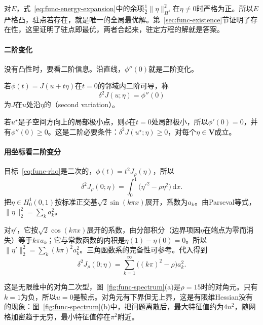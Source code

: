 对$E$，式~\eqref{eq:func-energy-expansion}中的余项$\frac12\lVert\eta\rVert_{H^1}^2$在$\eta\neq0$时严格为正。所以$E$严格凸，驻点若存在，就是唯一的全局最优解。第~\ref{sec:func-existence}节证明了存在性，这里证明了驻点即最优，两者合起来，驻定方程的解就是答案。

\paragraph{二阶变化}
没有凸性时，要看二阶信息。沿直线，$\phi''(0)$就是二阶变化。

\begin{definition}[二阶变分]
\label{def:func-second-variation}
若$\phi(t)=J(u+t\eta)$在$t=0$的邻域内二阶可导，称
\begin{equation}
 \delta^2J(u;\eta)=\phi''(0)
 \label{eq:func-second-variation}
\end{equation}
为$J$在$u$处沿$\eta$的（second variation）。
\end{definition}

若$u^\star$是子空间方向上的局部极小点，则$\phi$在$t=0$处局部极小，所以$\phi'(0)=0$，并有$\phi''(0)\geq0$。这是二阶必要条件：$\delta^2J(u^\star;\eta)\geq0$，对每个$\eta\in\bm{V}$成立。

\paragraph{用坐标看二阶变分}
目标~\eqref{eq:func-rho}是二次的，$\phi(t)=t^2J_\rho(\eta)$，所以
\[
 \delta^2J_\rho(0;\eta)=\int_0^1\bigl(\eta'^2-\rho\eta^2\bigr)\,\mathrm{d}x.
\]
把$\eta\in H^1_0(0,1)$按标准正交基$\sqrt2\sin(k\pi x)$展开，系数为$a_k$。由Parseval等式，$\lVert\eta\rVert_2^2=\sum_ka_k^2$。

对$\eta'$，它按$\sqrt2\cos(k\pi x)$展开的系数，由分部积分（边界项因$\eta$在端点为零而消失）等于$k\pi a_k$；它与常数函数的内积是$\eta(1)-\eta(0)=0$。所以$\lVert\eta'\rVert_2^2=\sum_k(k\pi)^2a_k^2$。三角函数系的完备性可参考。代入得到
\begin{equation}
 \delta^2J_\rho(0;\eta)=\sum_{k=1}^\infty\bigl((k\pi)^2-\rho\bigr)a_k^2.
 \label{eq:func-spectrum}
\end{equation}

这是无限维中的对角二次型，图~\ref{fig:func-spectrum}(a)是$\rho=15$时的对角元。只有$k=1$为负，所以$u=0$是鞍点。对角元有下界但无上界，这是有限维Hessian没有的现象：图~\ref{fig:func-spectrum}(b)中，把问题离散后，最大特征值约为$4n^2$，随网格加密趋于无穷，最小特征值停在$\pi^2$附近。


